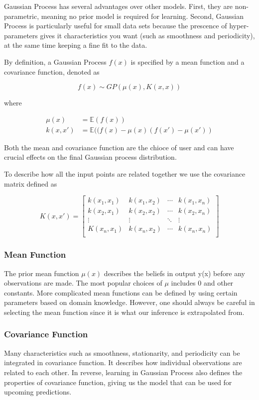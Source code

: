 \documentclass[14pt]{report}
\numberwithin{equation}{chapter}
\begin{document}
\begin{spacing}{2}
Gaussian Process has several advantages over other models. First, they are non-parametric, meaning no prior model is required for learning. Second, Gaussian Process is particularly useful for small data sets because the prescence of hyper-parameters gives it characteristics you want (such as smoothness and periodicity), at the same time keeping a fine fit to the data.  

By definition, a Gaussian Process $f(x)$ is specified by a mean function and a covariance function, denoted as  

\[f(x) \sim GP(\mu(x),K(x,x))\]

where

\begin{align}
\mu(x) &= \mathbb{E}(f(x))\\
k(x,x\prime) &= \mathbb{E}((f(x) - \mu(x)(f(x\prime) - \mu(x\prime)) 
\end{align}

Both the mean and covariance function are the chioce of user and can have crucial effects on the final Gaussian process distribution.

To describe how all the input points are related together we use the covariance matrix defined as 

\begin{equation}
K(x,x\prime) = \left[\begin{array}{cccc}
k(x_1,x_1) & k(x_1,x_2) & \cdots & k(x_1,x_n)\\
k(x_2,x_1) & k(x_2,x_2) & \cdots & k(x_2,x_n)\\
\vdots & \vdots & \ddots & \vdots\\
K(x_n,x_1) & k(x_n,x_2) & \cdots & k(x_n,x_n)\\

\end{array}\right]
\end{equation}

\subsubsection{Mean Function}
The prior mean function $\mu(x)$ describes the beliefs in output y(x) before any observations are made. The most popular choices of $\mu$ includes 0 and other constants. More complicated mean functions can be defined by using certain parameters based on domain knowledge. However, one should always be careful in selecting the mean function since it is what our inference is extrapolated from.   

\subsubsection{Covariance Function}
Many characteristics such as smoothness, stationarity, and periodicity can be integrated in covariance function. It describes how individual observations are related to each other. In reverse, learning in Gaussian Process also defines the properties of covariance function, giving us the model that can be used for upcoming predictions.   


\end{spacing}
\end{document}
